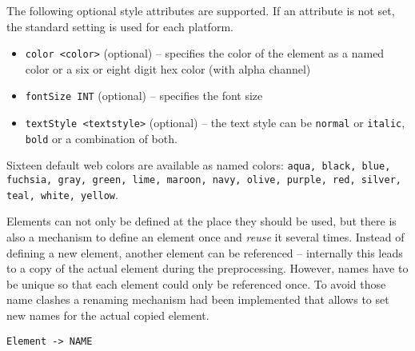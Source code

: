 The following optional style attributes are supported. If an attribute is not set, the standard setting is used for each platform.
\begin{itemize}
\item \lstinline!color <color>! (optional) -- specifies the color of the element as a named color or a six or eight digit hex color (with alpha channel)
\item \lstinline!fontSize INT! (optional) -- specifies the font size
\item \lstinline!textStyle <textstyle>! (optional) -- the text style can be \lstinline!normal! or \lstinline!italic!, \lstinline!bold! or a combination of both.
\end{itemize}

Sixteen default web colors are available as named colors: \lstinline!aqua, black, blue, fuchsia, gray, green, lime, maroon, navy, olive, purple, red, silver, teal, white, yellow!.

Elements can not only be defined at the place they should be used, but there is also a mechanism to define an element once and \textit{reuse} it several times. Instead of defining a new element, another element can be referenced -- internally this leads to a copy of the actual element during the preprocessing. However, names have to be unique so that each element could only be referenced once. To avoid those name clashes a renaming mechanism had been implemented that allows to set new names for the actual copied element.
\begin{lstlisting}
Element -> NAME
\end{lstlisting}
